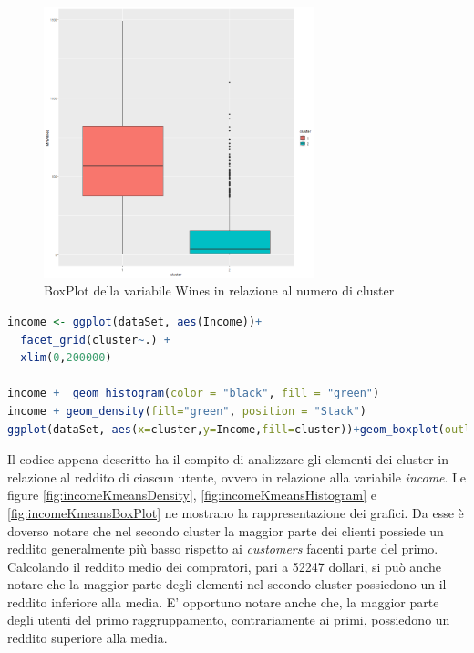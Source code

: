 \documentclass[letterpaper,11pt]{article}
\begin{document}
\begin{figure}[H]
    \centering
    \includegraphics[width=0.7\textwidth]{Img/K-MEANS/KMEANS009.png}
    \caption{BoxPlot della variabile Wines in relazione al numero di cluster}
    \label{fig:winesKmeansBoxPlot}
\end{figure}

\begin{lstlisting}[language=R]
income <- ggplot(dataSet, aes(Income))+ 
  facet_grid(cluster~.) + 
  xlim(0,200000)

income +  geom_histogram(color = "black", fill = "green")
income + geom_density(fill="green", position = "Stack")
ggplot(dataSet, aes(x=cluster,y=Income,fill=cluster))+geom_boxplot(outlier.colour="black") + ylim(0,200000)
\end{lstlisting}
Il codice appena descritto ha il compito di analizzare gli elementi dei cluster in relazione al reddito di ciascun utente, ovvero in relazione alla variabile \textit{income}. Le figure \ref{fig:incomeKmeansDensity}, \ref{fig:incomeKmeansHistogram} e \ref{fig:incomeKmeansBoxPlot} ne mostrano la rappresentazione dei grafici. Da esse è doverso notare che nel secondo cluster la maggior parte dei clienti possiede un reddito generalmente più basso rispetto ai \textit{customers} facenti parte del primo. Calcolando il reddito medio dei compratori, pari a 52247 dollari, si può anche notare che la maggior parte degli elementi nel secondo cluster possiedono un il reddito inferiore alla media. E' opportuno notare anche che, la maggior parte degli utenti del primo raggruppamento, contrariamente ai primi, possiedono un reddito superiore alla media.
\end{document}
